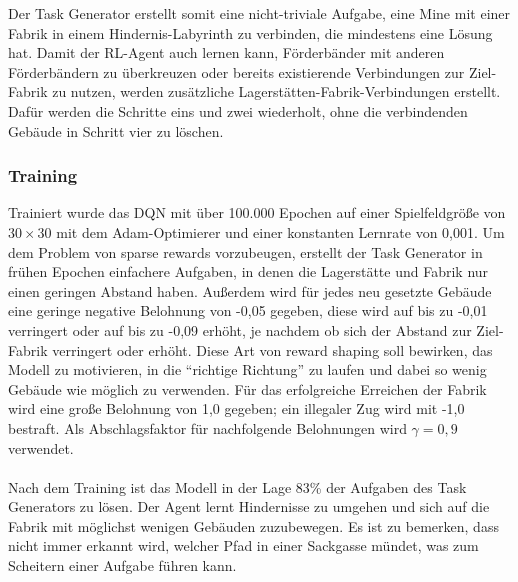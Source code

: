 Der Task Generator erstellt somit eine nicht-triviale Aufgabe, eine Mine mit einer Fabrik in einem Hindernis-Labyrinth zu verbinden, die mindestens eine Lösung hat.
Damit der RL-Agent auch lernen kann, Förderbänder mit anderen Förderbändern zu überkreuzen oder bereits existierende Verbindungen zur Ziel-Fabrik zu nutzen, werden zusätzliche Lagerstätten-Fabrik-Verbindungen erstellt. Dafür werden die Schritte eins und zwei wiederholt, ohne die verbindenden Gebäude in Schritt vier zu löschen.

\subsubsection*{Training}
Trainiert wurde das DQN  mit über 100.000 Epochen auf einer Spielfeldgröße von $30\times30$ mit dem Adam-Optimierer und einer konstanten Lernrate von 0,001. Um dem Problem von \dq{}sparse rewards\dq{} vorzubeugen, erstellt der Task Generator in frühen Epochen einfachere Aufgaben, in denen die Lagerstätte und Fabrik nur einen geringen Abstand haben. Außerdem wird für jedes neu gesetzte Gebäude eine geringe negative Belohnung von -0,05 gegeben, diese wird auf bis zu -0,01 verringert oder auf bis zu -0,09 erhöht, je nachdem ob sich der Abstand zur Ziel-Fabrik verringert oder erhöht. Diese Art von \dq{}reward shaping\dq{} soll bewirken, das Modell zu motivieren, in die “richtige Richtung” zu laufen und dabei so wenig Gebäude wie möglich zu verwenden. Für das erfolgreiche Erreichen der Fabrik wird eine große Belohnung von 1,0 gegeben; ein illegaler Zug wird mit -1,0 bestraft. Als Abschlagsfaktor für nachfolgende Belohnungen wird $\gamma=0,9$ verwendet.
\\\\
Nach dem Training ist das Modell in der Lage 83\% der Aufgaben des Task Generators zu lösen. Der Agent lernt Hindernisse zu umgehen und sich auf die Fabrik mit möglichst wenigen Gebäuden zuzubewegen. Es ist zu bemerken, dass nicht immer erkannt wird, welcher Pfad in einer Sackgasse mündet, was zum Scheitern einer Aufgabe führen kann.

